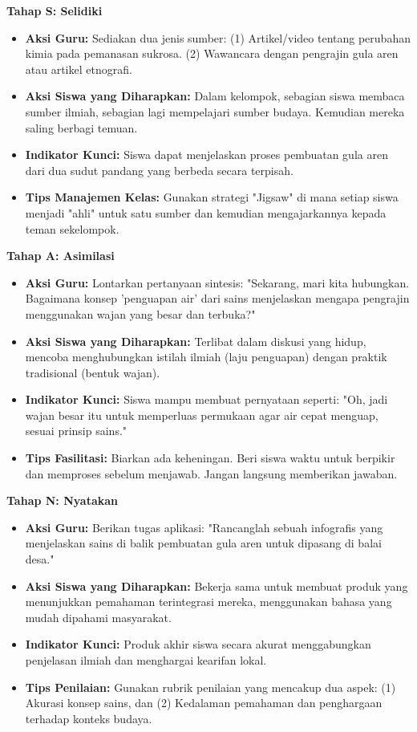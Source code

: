 \documentclass[12pt,a4paper,oneside]{book}
\begin{document}
\textbf{Tahap S: Selidiki}
\begin{itemize}
    \item \textbf{Aksi Guru:} Sediakan dua jenis sumber: (1) Artikel/video tentang perubahan kimia pada pemanasan sukrosa. (2) Wawancara dengan pengrajin gula aren atau artikel etnografi.
    \item \textbf{Aksi Siswa yang Diharapkan:} Dalam kelompok, sebagian siswa membaca sumber ilmiah, sebagian lagi mempelajari sumber budaya. Kemudian mereka saling berbagi temuan.
    \item \textbf{Indikator Kunci:} Siswa dapat menjelaskan proses pembuatan gula aren dari dua sudut pandang yang berbeda secara terpisah.
    \item \textbf{Tips Manajemen Kelas:} Gunakan strategi "Jigsaw" di mana setiap siswa menjadi "ahli" untuk satu sumber dan kemudian mengajarkannya kepada teman sekelompok.
\end{itemize}

\textbf{Tahap A: Asimilasi}
\begin{itemize}
    \item \textbf{Aksi Guru:} Lontarkan pertanyaan sintesis: "Sekarang, mari kita hubungkan. Bagaimana konsep 'penguapan air' dari sains menjelaskan mengapa pengrajin menggunakan wajan yang besar dan terbuka?"
    \item \textbf{Aksi Siswa yang Diharapkan:} Terlibat dalam diskusi yang hidup, mencoba menghubungkan istilah ilmiah (laju penguapan) dengan praktik tradisional (bentuk wajan).
    \item \textbf{Indikator Kunci:} Siswa mampu membuat pernyataan seperti: "Oh, jadi wajan besar itu untuk memperluas permukaan agar air cepat menguap, sesuai prinsip sains."
    \item \textbf{Tips Fasilitasi:} Biarkan ada keheningan. Beri siswa waktu untuk berpikir dan memproses sebelum menjawab. Jangan langsung memberikan jawaban.
\end{itemize}

\textbf{Tahap N: Nyatakan}
\begin{itemize}
    \item \textbf{Aksi Guru:} Berikan tugas aplikasi: "Rancanglah sebuah infografis yang menjelaskan sains di balik pembuatan gula aren untuk dipasang di balai desa."
    \item \textbf{Aksi Siswa yang Diharapkan:} Bekerja sama untuk membuat produk yang menunjukkan pemahaman terintegrasi mereka, menggunakan bahasa yang mudah dipahami masyarakat.
    \item \textbf{Indikator Kunci:} Produk akhir siswa secara akurat menggabungkan penjelasan ilmiah dan menghargai kearifan lokal.
    \item \textbf{Tips Penilaian:} Gunakan rubrik penilaian yang mencakup dua aspek: (1) Akurasi konsep sains, dan (2) Kedalaman pemahaman dan penghargaan terhadap konteks budaya.
\end{itemize}
\end{document}
